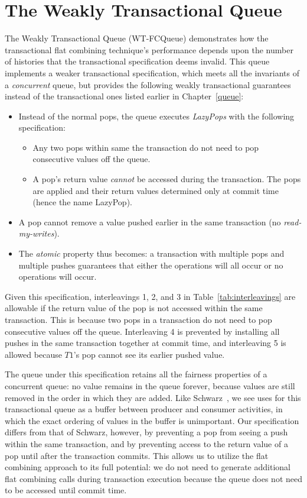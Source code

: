 \section{The Weakly Transactional Queue} 

The Weakly Transactional Queue (WT-FCQueue) demonstrates how the transactional flat combining technique's performance depends upon the number of histories that the transactional specification deems invalid. This queue implements a weaker transactional specification, which meets all the invariants of a \emph{concurrent} queue, but provides the following weakly transactional guarantees instead of the transactional ones listed earlier in Chapter~\ref{queue}:
\begin{itemize}
    \item Instead of the normal pops, the queue executes \emph{LazyPops} with the following specification:
        \begin{itemize}
            \item Any two pops within same the transaction do not need to pop consecutive values off the queue.
            \item A pop's return value \emph{cannot} be accessed during the transaction. The pops are applied and their return values determined only at commit time (hence the name LazyPop). 
        \end{itemize}
    \item A pop cannot remove a value pushed earlier in the same transaction (no \emph{read-my-writes}).
    \item The \emph{atomic} property thus becomes: a transaction with multiple pops and multiple pushes guarantees that either the operations will all occur or no operations will occur.
\end{itemize}

Given this specification, interleavings 1, 2, and 3 in Table~\ref{tab:interleavings} are allowable if the return value of the pop is not accessed within the same transaction. This is because two pops in a transaction do not need to pop consecutive values off the queue. Interleaving 4 is prevented by installing all pushes in the same transaction together at commit time, and interleaving 5 is allowed because $T1$'s pop cannot see its earlier pushed value.

The queue under this specification retains all the fairness properties of a concurrent queue: no value remains in the queue forever, because values are still removed in the order in which they are added. Like Schwarz~\cite{schwarz}, we see uses for this transactional queue as a buffer between producer and consumer activities, in which the exact ordering of values in the buffer is unimportant.
Our specification differs from that of Schwarz, however, by preventing a pop from seeing a push within the same transaction, and by preventing access to the return value of a pop until after the transaction commits. This allows us to utilize the flat combining approach to its full potential: we do not need to generate additional flat combining calls during transaction execution because the queue does not need to be accessed until commit time.

